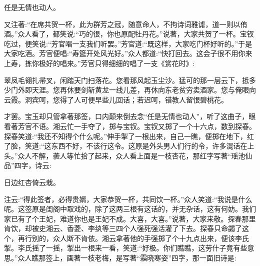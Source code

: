 \begin{poem}
    \begin{pl}任是无情也动人。\end{pl}
\end{poem}


\begin{parag}
    又注著:“在席共贺一杯，此为群芳之冠，随意命人，不拘诗词雅谑，道一则以侑酒。”众人看了，都笑说:“巧的很，你也原配牡丹花。”说著，大家共贺了一杯。宝钗吃过，便笑说:“芳官唱一支我们听罢。”芳官道:“既这样，大家吃门杯好听的。”于是大家吃酒。芳官便唱:“寿筵开处风光好。”众人都道:“快打回去。这会子很不用你来上寿，拣你极好的唱来。”芳官只得细细的唱了一支《赏花时》:
\end{parag}


\begin{qute2sp}
    翠凤毛翎扎帚叉，闲踏天门扫落花。您看那风起玉尘沙。猛可的那一层云下，抵多少门外即天涯。您再休要剑斩黄龙一线儿差，再休向东老贫穷卖酒家。您与俺眼向云霞。洞宾呵，您得了人可便早些儿回话；若迟呵，错教人留恨碧桃花。
\end{qute2sp}


\begin{parag}
    才罢。宝玉却只管拿著那签，口内颠来倒去念“任是无情也动人”，听了这曲子，眼看著芳官不语。湘云忙一手夺了，掷与宝钗。宝钗又掷了一个十六点，数到探春。探春笑道:“我还不知得个什么呢。”伸手掣了一根出来，自己一瞧，便掷在地下，红了脸，笑道:“这东西不好，不该行这令。这原是外头男人们行的令，许多混话在上头。”众人不解，袭人等忙拾了起来，众人看上面是一枝杏花，那红字写著“瑶池仙品”四字，诗云:
\end{parag}


\begin{poem}
    \begin{pl}日边红杏倚云栽。\end{pl}

\end{poem}


\begin{parag}
    注云:“得此签者，必得贵婿，大家恭贺一杯，共同饮一杯。”众人笑道:“我说是什么呢。这签原是闺阁中取戏的，除了这两三根有这话的，并无杂话，这有何妨。我们家已有了个王妃，难道你也是王妃不成。大喜，大喜。”说著，大家来敬。探春那里肯饮，却被史湘云、香菱、李纨等三四个人强死强活灌了下去。探春只命蠲了这个，再行别的，众人断不肯依。湘云拿著他的手强掷了个十九点出来，便该李氏掣。李氏摇了一摇，掣出一根来一看，笑道:“好极。你们瞧瞧，这劳什子竟有些意思。”众人瞧那签上，画著一枝老梅，是写著“霜晓寒姿”四字，那一面旧诗是:
\end{parag}


